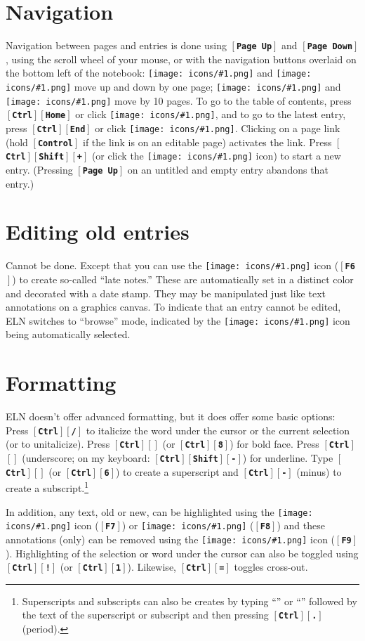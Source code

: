 \documentclass[11pt]{report}
\def\keystroke#1{$\left[\right.\!${\tt\bfseries #1}$\!\left.\right]$}
\def\key#1{\keystroke{#1}}
\def\keycombo#1#2{\keystroke{#1}\keystroke{#2}}
\def\keycontrol#1{\keycombo{Ctrl}{#1}}
\def\controlshift#1{\keystroke{Ctrl}\keystroke{Shift}\keystroke{#1}}
\def\keyctrlhat{\keycontrol{\char94}}
\def\keyhat{``{\tt\char94}''}
\def\keyctrlunderscore{\keycontrol{\char95}}
\def\keyunderscore{``{\tt\char95}''}
\def\icon#1{\raise-2pt\hbox{\texttt{[image: icons/\#1.png]}}}
\begin{document}
\section{Navigation}

Navigation between pages and entries is done using \key{Page Up} and
\key{Page Down}, using the scroll wheel of your mouse, or with the
navigation buttons overlaid on the bottom left of the notebook:
\icon{nav-prev} and \icon{nav-next} move up and down by one page;
\icon{nav-p10} and \icon{nav-n10} move by 10 pages. To go
to the table of contents, press \keycontrol{Home} or click
\icon{nav-toc}, and to go to the latest entry, press \keycontrol{End}
or click \icon{nav-end}. Clicking on a page link (hold \key{Control}
if the link is on an editable page) activates the link. Press
\controlshift{+} (or click the \icon{nav-plus} icon) to start a new
entry. (Pressing
\key{Page Up} on an untitled and empty  entry  abandons that 
entry.)

\section{Editing old entries}

Cannot be done. Except that you can use the \icon{note} icon (\key{F6}) to
create so-called ``late notes.'' These are automatically set in a
distinct color and decorated with a date stamp. They
may be manipulated just like text annotations on a graphics canvas. To
indicate that an entry cannot be edited, ELN switches to ``browse''
mode, indicated by the \icon{browse} icon being automatically selected.

\section{Formatting}

ELN doesn't offer advanced formatting, but it does offer some basic
options: Press \keycontrol{/} to italicize the word under the
cursor or the current selection (or to unitalicize). Press
\keycontrol{*} (or \keycontrol{8}) for bold face. Press
\keyctrlunderscore{} (underscore; on my keyboard:
\controlshift{-}) for underline. Type
\keyctrlhat{} (or \keycontrol{6}) to create a
superscript and \keycontrol{-} (minus) to create a
subscript.\footnote{Superscripts and subscripts can also be creates by typing
  \keyhat{} or \keyunderscore{} followed by the text of the
  superscript or subscript and then pressing \keycontrol{.} (period).}

In addition, any text, old or new, can be highlighted using the
\icon{highlight} icon (\key{F7}) or \icon{strikeout} (\key{F8}) and these
annotations (only) can be removed using the \icon{plain} icon
(\key{F9}). Highlighting of the selection or word under the cursor can
also be toggled using \keycontrol{!} (or \keycontrol{1}). Likewise,
\keycontrol{=} toggles cross-out.
\end{document}
